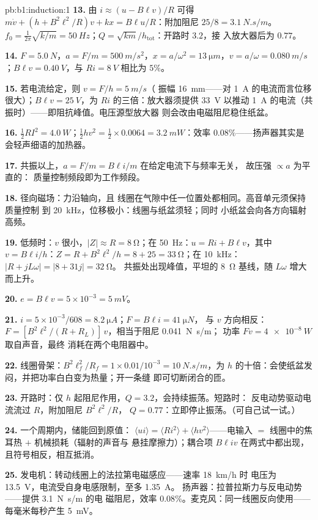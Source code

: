 \begin{solution}{pb:b1:induction:1}
\textbf{13.} 由 $i \approx (u - B\ell v)/R$ 可得 $m\dot v + (h + B^2\ell^2/R)v + kx =
B\ell u/R$：附加阻尼 $25/8 = \qty{3.1}{N.s/m}$。$f_0 = \tfrac1{2\pi}\sqrt{k/m} =
\qty{50}{Hz}$；$Q = \sqrt{km}/h_{\text{tot}}$：开路时 $3.2$，接
入放大器后为 $0.77$。

\textbf{14.} $F = \qty{5.0}{N}$，$a = F/m = \qty{500}{m/s^2}$，$x = a/\omega^2 =
\qty{13}{\micro m}$，$v = a/\omega = \qty{0.080}{m/s}$；$B\ell v = \qty{0.40}{V}$，与
$Ri = \qty{8}{V}$ 相比为 $5\%$。

\textbf{15.} 若电流给定，则 $v = F/h = \qty{5}{m/s}$（
振幅 \qty{16}{mm}——对 \qty{1}{A} 的电流而言位移很大）；$B\ell v =
\qty{25}{V}$，为 $Ri$ 的三倍：放大器须提供 \qty{33}{V} 以推动
\qty{1}{A} 的电流（共振时）——即阻抗峰值。电压源型放大器
则会改由电磁阻尼稳住纸盆。

\textbf{16.} $\tfrac12RI^2 = \qty{4.0}{W}$；$\tfrac12hv^2 = \tfrac12 \times 0.0064 =
\qty{3.2}{mW}$：效率 $0.08\%$——扬声器其实是
会轻声细语的加热器。

\textbf{17.} 共振以上，$a = F/m = B\ell i/m$ 在给定电流下与频率无关，
故压强 $\propto a$ 为平直的：
质量控制频段即为工作频段。

\textbf{18.} 径向磁场：力沿轴向，且
线圈在气隙中任一位置处都相同。高音单元须保持质量控制
到 \qty{20}{kHz}，位移极小：线圈与纸盆须轻；同时
小纸盆会向各方向辐射高频。

\textbf{19.} 低频时：$v$ 很小，$|Z| \approx R = \qty{8}{\ohm}$；在
\qty{50}{Hz}：$u = Ri + B\ell v$，其中 $v = B\ell i/h$：$Z = R + B^2\ell^2/h = 8 + 25 =
\qty{33}{\ohm}$；在 \qty{10}{kHz}：$|R + jL\omega| = |8 + 31j| = \qty{32}{\ohm}$。
共振处出现峰值，平坦的 \qty{8}{\ohm} 基线，随 $L\omega$ 增大而上升。

\textbf{20.} $e = B\ell v = 5 \times 10^{-3} = \qty{5}{mV}$。

\textbf{21.} $i = 5 \times 10^{-3}/608 = \qty{8.2}{\micro A}$；$F = B\ell i = \qty{41}{\micro N}$，
与 $v$ 方向相反：$F = [B^2\ell^2/(R + R_L)]\,v$，相当于阻尼 \qty{0.041}{N.s/m}；
功率 $Fv = \qty{4e-8}{W}$ 取自声音，最终
消耗在两个电阻器中。

\textbf{22.} 线圈骨架：$B^2\ell_f^2/R_f = 1 \times 0.01/10^{-3} = \qty{10}{N.s/m}$，为
$h$ 的十倍：会使纸盆发闷，并把功率白白变为热量；开一条缝
即可切断闭合的匝。

\textbf{23.} 开路时：仅 $h$ 起阻尼作用，$Q = 3.2$，会持续振荡。短路时：
反电动势驱动电流流过 $R$，附加阻尼 $B^2\ell^2/R$，
$Q = 0.77$：立即停止振荡。（可自己试一试。）

\textbf{24.} 一个周期内，储能回到原值：
$\langle ui\rangle = \langle Ri^2\rangle + \langle hv^2\rangle$——电输入 $=$
线圈中的焦耳热 $+$ 机械损耗（辐射的声音与
悬挂摩擦力）；耦合项 $B\ell iv$ 在两式中都出现，
且符号相反，相互抵消。

\textbf{25.} 发电机：转动线圈上的法拉第电磁感应——速率 \qty{18}{km/h} 时
电压为 \qty{13.5}{V}，电流受自身电感限制，至多 \qty{1.35}{A}。
扬声器：拉普拉斯力与反电动势——提供 \qty{3.1}{N.s/m} 的电
磁阻尼，效率 $0.08\%$。麦克风：同一线圈反向使用——
每毫米每秒产生 \qty{5}{mV}。
\end{solution}
